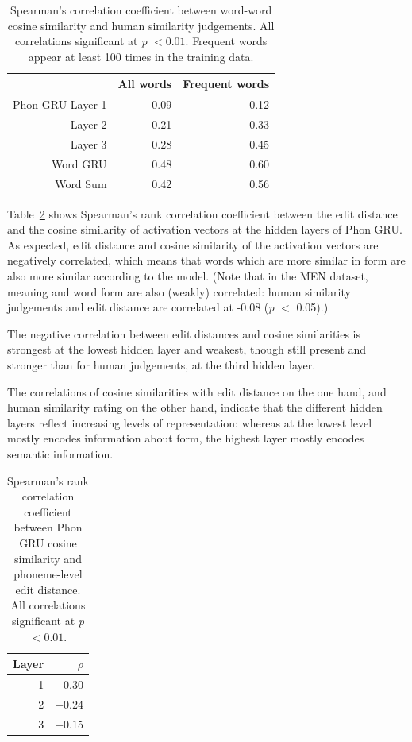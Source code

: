 \begin{table}[]
	\centering
	\begin{tabular}{rrr}
                          & All words & Frequent words \\\hline
{\sc Phon GRU} Layer 1 & 0.09 & 0.12\\
		  Layer 2 & 0.21 & 0.33 \\
		  Layer 3 & 0.28 & 0.45 \\
		\hline
{\sc Word GRU} & 0.48 & 0.60\\	\hline
{\sc Word Sum} & 0.42 & 0.56
	\end{tabular}
	\caption{Spearman's correlation coefficient between
          word-word cosine similarity and human similarity judgements. All
          correlations significant at \textit{p} $< 0.01$. Frequent
          words appear at least 100 times in the training data.} 
\label{tab:human}
\end{table}

Table~\ref{tab:edit} shows Spearman's rank correlation coefficient between the edit distance and the cosine similarity of activation vectors at the hidden layers of {\sc Phon GRU}.
As expected, edit distance and cosine similarity of the activation vectors are negatively correlated, which means that words which are more similar in form are also more similar according to the model. (Note that in the MEN dataset, meaning and word form are also (weakly) correlated: human similarity judgements and edit distance are correlated at -0.08 (\textit{p} $<$ 0.05).)

The negative correlation between edit distances and cosine similarities is strongest at the lowest hidden layer and weakest, though still present and stronger than for human judgements, at the third hidden layer. 

The correlations of cosine similarities with edit distance on the one hand, and human similarity rating on the other hand, indicate that the different hidden layers reflect increasing levels of representation: whereas at the lowest level mostly encodes information about form, the highest layer mostly encodes semantic information.

\begin{table}[h]
	\centering
	\begin{tabular}{rr}
                Layer   & $\rho$ \\\hline
		      1 & $-0.30$ \\
		      2 & $-0.24$ \\
		      3 & $-0.15$
	\end{tabular}
	\caption{Spearman's rank correlation coefficient between
          {\sc Phon GRU} cosine similarity and phoneme-level edit distance. All correlations significant at \textit{p} $< 0.01$.} 
\label{tab:edit}
\end{table}

